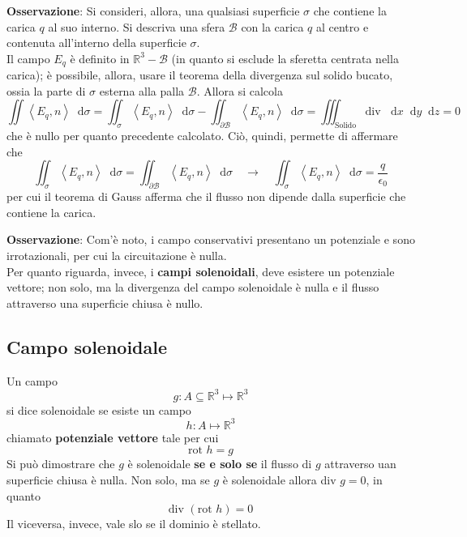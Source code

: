 \documentclass[a4paper]{extarticle}
\newcommand*\dif{\mathop{}\!\mathrm{d}}
\begin{document}
\vspace{2em}
\noindent
\textbf{Osservazione}: Si consideri, allora, una qualsiasi superficie $\sigma$ che contiene la carica $q$ al suo interno. Si descriva una sfera $\mathcal{B}$ con la carica $q$ al centro e contenuta all'interno della superficie $\sigma$.\\
Il campo $E_q$ è definito in $\mathbb{R}^3 - \mathcal{B}$ (in quanto si esclude la sferetta centrata nella carica); è possibile, allora, usare il teorema della divergenza sul solido bucato, ossia la parte di $\sigma$ esterna alla palla $\mathcal{B}$. Allora si calcola
\[\iint \left<E_q,n\right> \dif \sigma = \iint_{\sigma} \left<E_q,n\right> \dif \sigma - \iint_{\partial \mathcal{B}} \left<E_q,n\right> \dif \sigma = \iiint_\text{Solido} \text{div } \dif x \dif y \dif z = 0\]
che è nullo per quanto precedente calcolato. Ciò, quindi, permette di affermare che
\[\iint_{\sigma} \left<E_q,n\right> \dif \sigma = \iint_{\partial \mathcal{B}} \left<E_q,n\right> \dif \sigma \hspace{1em} \rightarrow \hspace{1em} \iint_\sigma \left<E_q,n\right> \dif \sigma = \dfrac{q}{\epsilon_0}\]
per cui il teorema di Gauss afferma che il flusso non dipende dalla superficie che contiene la carica.

\vspace{2em}
\noindent
\textbf{Osservazione}: Com'è noto, i campo conservativi presentano un potenziale e sono irrotazionali, per cui la circuitazione è nulla.\\
Per quanto riguarda, invece, i \textbf{campi solenoidali}, deve esistere un potenziale vettore; non solo, ma la divergenza del campo solenoidale è nulla e il flusso attraverso una superficie chiusa è nullo.

\vspace{1em}
\noindent
\subsection{Campo solenoidale}
Un campo
\[g : A \subseteq \mathbb{R}^3 \longmapsto \mathbb{R}^3\] 
si dice solenoidale se esiste un campo
\[h : A \longmapsto \mathbb{R}^3\]
chiamato \textbf{potenziale vettore} tale per cui
\[\text{rot } h = g\]
Si può dimostrare che $g$ è solenoidale \textbf{se e solo se} il flusso di $g$ attraverso uan superficie chiusa è nulla. Non solo, ma se $g$ è solenoidale allora div $g=0$, in quanto
\[\text{div } \left(\text{rot } h\right) = 0\]
Il viceversa, invece, vale slo se il dominio è stellato.
\end{document}
